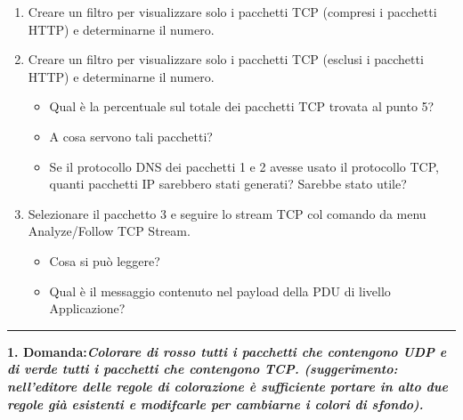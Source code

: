 \documentclass[a4paper]{article}
\newcommand{\longline}{\noindent\rule{\textwidth}{0.4pt}}
\begin{document}
\begin{enumerate}
		\item Creare un filtro per visualizzare solo i pacchetti TCP (compresi i pacchetti HTTP) e determinarne il numero.
		
		\item Creare un filtro per visualizzare solo i pacchetti TCP (esclusi i pacchetti HTTP) e determinarne il numero.
		\begin{itemize}
			\item Qual è la percentuale sul totale dei pacchetti TCP trovata al punto 5?
			\item A cosa servono tali pacchetti?
			\item Se il protocollo DNS dei pacchetti 1 e 2 avesse usato il protocollo TCP, quanti pacchetti IP sarebbero stati generati? Sarebbe stato utile?
		\end{itemize}
		
		\item Selezionare il pacchetto 3 e seguire lo stream TCP col comando da menu \textsf{Analyze/Follow TCP Stream}.
		\begin{itemize}
			\item Cosa si può leggere?
			\item Qual è il messaggio contenuto nel payload della PDU di livello Applicazione?
		\end{itemize}
	\end{enumerate}
	
	\noindent\longline\newline
	
	\noindent
	\textcolor{Red3}{\textbf{1. Domanda:}}\textbf{\emph{Colorare di rosso tutti i pacchetti che contengono UDP e di verde tutti i pacchetti che contengono TCP.\newline
	(\emph{suggerimento}: nell'editore delle regole di colorazione è sufficiente portare in alto due regole già esistenti e modifcarle per cambiarne i colori di sfondo).}}\newline
\end{document}
